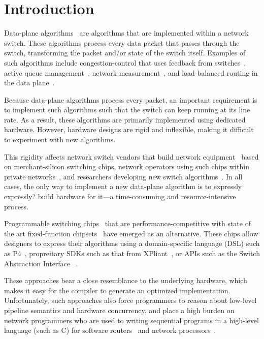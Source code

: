 \section{Introduction}
\label{s:intro}

Data-plane algorithms~\cite{cestan} are algorithms that are implemented within
a network switch. These algorithms process every data packet that passes
through the switch, transforming the packet and/or state of the switch itself.
Examples of such algorithms include congestion-control that uses feedback from
switches~\cite{xcp, rcp, pdq, dctcp}, active queue management~\cite{codel},
network measurement~\cite{opensketch, bitmap_george, elephant_george}, and
load-balanced routing in the data plane~\cite{conga}.

Because data-plane algorithms process every packet, an important requirement is
to implement such algorithms such that the switch can keep running at 
its line rate. As a result, these algorithms
are primarily implemented using dedicated hardware. However, hardware designs
are rigid and inflexible, making it difficult to experiment with new
algorithms.

This rigidity affects network switch vendors that build network
equipment~\cite{cisco_nexus, dell_force10, arista_7050} based on
merchant-silicon switching chips,  network operators using such chips within
private networks~\cite{jupiter,amazon,isp}, and researchers developing new
switch algorithms~\cite{xcp, codel, d3, detail, pdq}. In all cases, the only
way to implement a new data-plane algorithm is to expressly \ac{expressly?} build hardware for
it---a time-consuming and resource-intensive process.

Programmable switching chips~\cite{flexpipe, xpliant, rmt} that are
performance-competitive with state of the art fixed-function
chipsets~\cite{trident, tomahawk, mellanox} have emerged as an alternative.
These chips allow designers to express their algorithms using a domain-specific
language (DSL) such as P4~\cite{p4}, propreitary SDKs such as that from 
XPliant~\cite{xpliant_sdk}, or APIs such as the Switch Abstraction Interface
~\cite{sai}.

These approaches bear a close resemblance to the underlying hardware, 
which makes it easy for the compiler to generate an optimized implementation.
Unfortunately, such approaches also force
programmers to reason about low-level pipeline semantics and hardware
concurrency, and place a high burden on network programmers who are used to
writing sequential programs in a high-level language (such as C) for software
routers~\cite{click} and network processors~\cite{packetc, ixp, microenginec,
nova}. 

